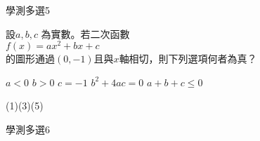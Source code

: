 \begin{QUESTIONS}
\begin{QUESTION}
\begin{QBODY}
        \end{QBODY}
        \begin{QFROMS}
        \end{QFROMS}
        \begin{QTAGS}\end{QTAGS}
        \begin{QANS}
        \end{QANS}
        \begin{QSOLLIST}
        \end{QSOLLIST}
        \begin{QEMPTYSPACE}
        \end{QEMPTYSPACE}
    \end{QUESTION}
    \begin{QUESTION}
        \begin{ExamInfo}{90}{學測}{多選}{5}
        \end{ExamInfo}
        \begin{ExamAnsRateInfo}{}{}{}{}
        \end{ExamAnsRateInfo}
        \begin{QBODY}
			設$ a,b,c $ 為實數。若二次函數\\
			$f\left( x \right)=a{{x}^{2}}+bx+c$\\
			的圖形通過$(0,-1)$且與$x$軸相切，則下列選項何者為真？
			\begin{QOPS}
				\QOP $a<0$
				\QOP $b>0$
				\QOP $c=-1$
				\QOP ${{b}^{2}}+4ac=0$
				\QOP $a+b+c\le 0$
			\end{QOPS}
        \end{QBODY}
        \begin{QFROMS}
        \end{QFROMS}
        \begin{QTAGS}\end{QTAGS}
        \begin{QANS}
            (1)(3)(5)
        \end{QANS}
        \begin{QSOLLIST}
        \end{QSOLLIST}
        \begin{QEMPTYSPACE}
        \end{QEMPTYSPACE}
    \end{QUESTION}
    \begin{QUESTION}
        \begin{ExamInfo}{90}{學測}{多選}{6}
        \end{ExamInfo}
        \begin{ExamAnsRateInfo}{}{}{}{}

\end{ExamAnsRateInfo}
\end{QUESTION}
\end{QUESTIONS}
